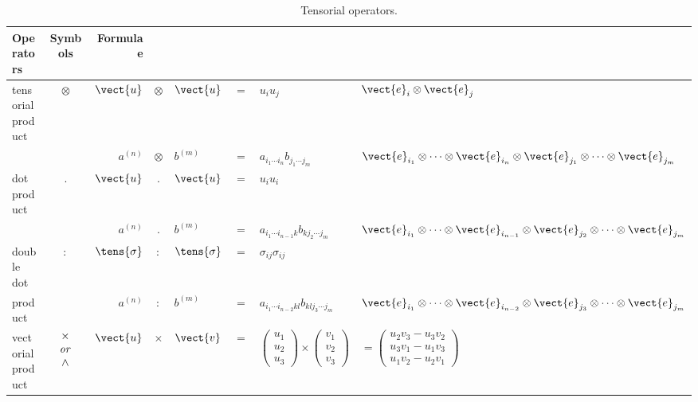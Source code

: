 \begin{table}[!hptb]
\centering
\begin{tabular}{l| c| r@{ \,}c@{\,}l  @{\,}c@{\,}l @{\,}l }
Operators & Symbols & Formulae \\
\hline
tensorial product & $\otimes$ & $\vect{u} $ & $ \otimes $ & $\vect{u}$ & $= $& $u_i u_j $&  $ \vect{e}_i \otimes \vect{e}_j $ \\
                         &                  & $a^{(n)}$ & $ \otimes $ & $b^{(m)} $& $= $&  $a_{i_1  \cdots i_n} b_{j_1  \cdots j_m}$ & $\vect{e}_{i_1} \otimes \cdots \otimes \vect{e}_{i_n} \otimes \vect{e}_{j_1} \otimes \cdots \otimes \vect{e}_{j_m} $ \\
\hline
dot product&$.$ & $\vect{u} $&$ . $&$\vect{u} $&$ = $&$ u_i u_i  $ \\
                          & &$ a^{(n)} $&$ . $&$ b^{(m)} $&$ = $&$ a_{i_1  \cdots i_{n-1}k} b_{k j_2  \cdots j_m} $&$ \vect{e}_{i_1} \otimes \cdots \otimes \vect{e}_{i_{n-1}} \otimes \vect{e}_{j_2} \otimes \cdots \otimes \vect{e}_{j_m} $ \\
\hline
double dot &$ : $&$ \tens{\sigma} $&$ : $&$ \tens{\sigma} $&$ = $&$ \sigma_{ij} \sigma_{ij}    $ \\
       product& &$ a^{(n)} $&$ : $&$ b^{(m)} $&$ = $&$ a_{i_1  \cdots i_{n-2}kl} b_{k l j_3  \cdots j_m} $&$ \vect{e}_{i_1} \otimes \cdots \otimes \vect{e}_{i_{n-2}} \otimes \vect{e}_{j_3} \otimes \cdots \otimes \vect{e}_{j_m} $ \\
\hline
vectorial product & 
$
\begin{array}{c}
 \times \\
\textrm{ \emph{or} } \\
\wedge
\end{array}
$ 
&$ \vect{u} $&$ \times $&$ \vect{v} $&$ = $&
$ \left( \begin{array}{c}
u_1\\
u_2 \\
u_3
\end{array} \right) \times 
\left( \begin{array}{c}
v_1\\
v_2 \\
v_3
\end{array} \right)  $
&$ = 
\left( \begin{array}{c}
u_2 v_3 - u_3 v_2\\
u_3 v_1 - u_1 v_3 \\
u_1 v_2 - u_2 v_1
\end{array} \right)
 $
\end{tabular}
\caption{Tensorial operators.}
\end{table}


